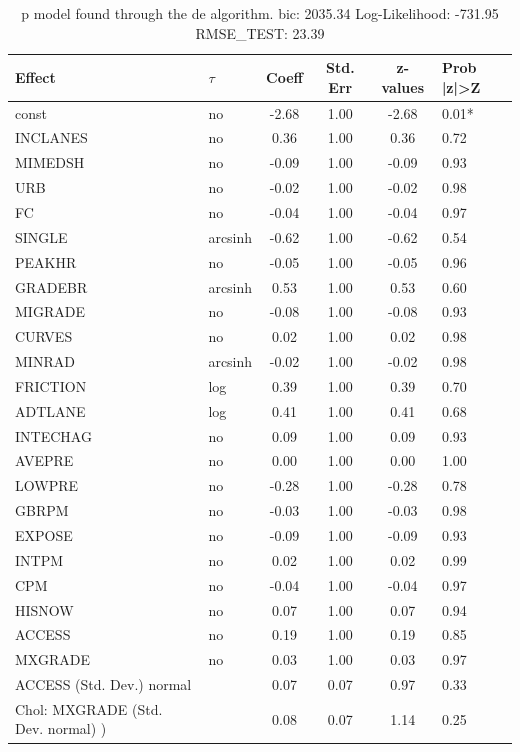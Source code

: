 \begin{table}
	\caption{p model found through the de algorithm. bic: 2035.34 Log-Likelihood: -731.95 RMSE_TEST: 23.39}
	\begin{center}
		\begin{tabular}{|l|l|c|c|c|l|}
			\hline
			Effect & $\tau$ & Coeff & Std. Err & z-values & Prob |z|>Z \\
			\hline
			const & no & -2.68 & 1.00 & -2.68 & 0.01* \\
			\hline
			INCLANES & no & 0.36 & 1.00 & 0.36 & 0.72 \\
			\hline
			MIMEDSH & no & -0.09 & 1.00 & -0.09 & 0.93 \\
			\hline
			URB & no & -0.02 & 1.00 & -0.02 & 0.98 \\
			\hline
			FC & no & -0.04 & 1.00 & -0.04 & 0.97 \\
			\hline
			SINGLE & arcsinh & -0.62 & 1.00 & -0.62 & 0.54 \\
			\hline
			PEAKHR & no & -0.05 & 1.00 & -0.05 & 0.96 \\
			\hline
			GRADEBR & arcsinh & 0.53 & 1.00 & 0.53 & 0.60 \\
			\hline
			MIGRADE & no & -0.08 & 1.00 & -0.08 & 0.93 \\
			\hline
			CURVES & no & 0.02 & 1.00 & 0.02 & 0.98 \\
			\hline
			MINRAD & arcsinh & -0.02 & 1.00 & -0.02 & 0.98 \\
			\hline
			FRICTION & log & 0.39 & 1.00 & 0.39 & 0.70 \\
			\hline
			ADTLANE & log & 0.41 & 1.00 & 0.41 & 0.68 \\
			\hline
			INTECHAG & no & 0.09 & 1.00 & 0.09 & 0.93 \\
			\hline
			AVEPRE & no & 0.00 & 1.00 & 0.00 & 1.00 \\
			\hline
			LOWPRE & no & -0.28 & 1.00 & -0.28 & 0.78 \\
			\hline
			GBRPM & no & -0.03 & 1.00 & -0.03 & 0.98 \\
			\hline
			EXPOSE & no & -0.09 & 1.00 & -0.09 & 0.93 \\
			\hline
			INTPM & no & 0.02 & 1.00 & 0.02 & 0.99 \\
			\hline
			CPM & no & -0.04 & 1.00 & -0.04 & 0.97 \\
			\hline
			HISNOW & no & 0.07 & 1.00 & 0.07 & 0.94 \\
			\hline
			ACCESS & no & 0.19 & 1.00 & 0.19 & 0.85 \\
			\hline
			MXGRADE & no & 0.03 & 1.00 & 0.03 & 0.97 \\
			\hline
			ACCESS (Std. Dev.) normal &  & 0.07 & 0.07 & 0.97 & 0.33 \\
			\hline
			 Chol: MXGRADE (Std. Dev. normal) ) &  & 0.08 & 0.07 & 1.14 & 0.25 \\
			\hline
		\end{tabular}
	\end{center}
\end{table}